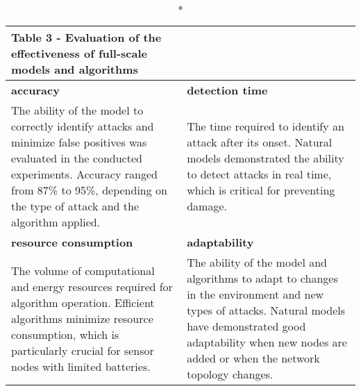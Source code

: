 \begin{longtable}{|p{7cm}|p{8cm}|}
  \caption*{Table 3 - Evaluation of the effectiveness of full-scale models and algorithms}\\
  \hline
  \textbf{accuracy} & \textbf{detection time} \\ \hline
  The ability of the model to correctly identify attacks and minimize false positives was evaluated in the conducted experiments. Accuracy ranged from 87\% to 95\%, depending on the type of attack and the algorithm applied. & 
  The time required to identify an attack after its onset. Natural models demonstrated the ability to detect attacks in real time, which is critical for preventing damage. \\ \hline
  \textbf{resource consumption} & \textbf{adaptability} \\ \hline
  The volume of computational and energy resources required for algorithm operation. Efficient algorithms minimize resource consumption, which is particularly crucial for sensor nodes with limited batteries. & 
  The ability of the model and algorithms to adapt to changes in the environment and new types of attacks. Natural models have demonstrated good adaptability when new nodes are added or when the network topology changes. \\ \hline
  \end{longtable}
  


